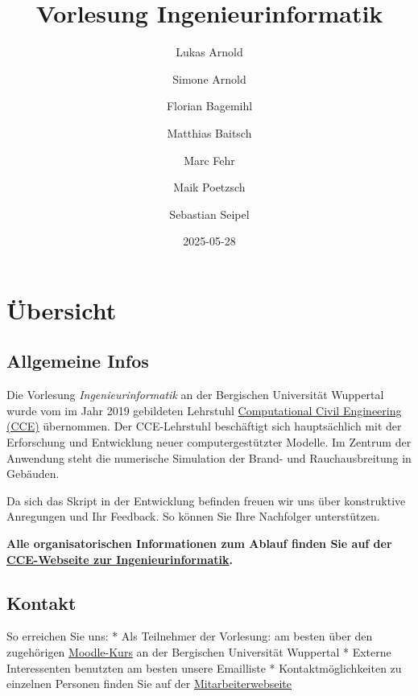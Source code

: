 \documentclass[
  letterpaper,
  DIV=11,
  numbers=noendperiod]{scrreprt}
\title{Vorlesung Ingenieurinformatik}
\author{Lukas Arnold \and Simone Arnold \and Florian
Bagemihl \and Matthias Baitsch \and Marc Fehr \and Maik
Poetzsch \and Sebastian Seipel}
\date{2025-05-28}
\renewcommand*\contentsname{Table of contents}
\newcommand\contentsname{Table of contents}
\begin{document}
\maketitle

\renewcommand*\contentsname{Table of contents}
{
\hypersetup{linkcolor=}
\setcounter{tocdepth}{2}
\tableofcontents
}


\chapter*{Übersicht}\label{uxfcbersicht}


\section*{Allgemeine Infos}\label{allgemeine-infos}


Die Vorlesung \emph{Ingenieurinformatik} an der Bergischen Universität
Wuppertal wurde vom im Jahr 2019 gebildeten Lehrstuhl
\href{https://cce.uni-wuppertal.de/}{Computational Civil Engineering
(CCE)} übernommen. Der CCE-Lehrstuhl beschäftigt sich hauptsächlich mit
der Erforschung und Entwicklung neuer computergestützter Modelle. Im
Zentrum der Anwendung steht die numerische Simulation der Brand- und
Rauchausbreitung in Gebäuden.

Da sich das Skript in der Entwicklung befinden freuen wir uns über
konstruktive Anregungen und Ihr Feedback. So können Sie Ihre Nachfolger
unterstützen.

\textbf{Alle organisatorischen Informationen zum Ablauf finden Sie auf
der
\href{https://cce.uni-wuppertal.de/index.php?id=4178&L=0}{CCE-Webseite
zur Ingenieurinformatik}.}

\section*{Kontakt}\label{kontakt}


So erreichen Sie uns: * Als Teilnehmer der Vorlesung: am besten über den
zugehörigen
\href{https://moodle.uni-wuppertal.de/course/view.php?id=46894}{Moodle-Kurs}
an der Bergischen Universität Wuppertal * Externe Interessenten
benutzten am besten unsere Emailliste * Kontaktmöglichkeiten zu
einzelnen Personen finden Sie auf der
\href{https://cce.uni-wuppertal.de/de/team/}{Mitarbeiterwebseite}
\end{document}
